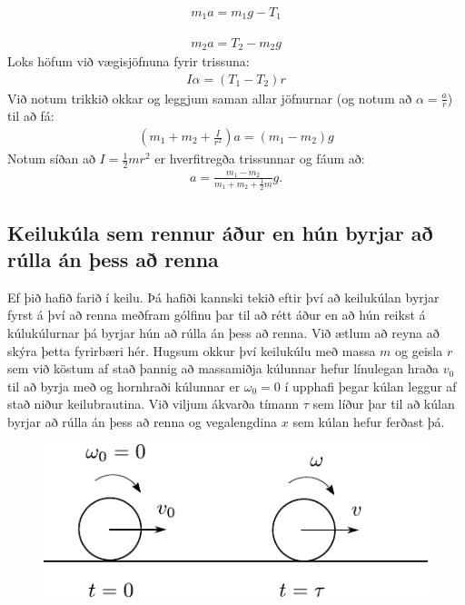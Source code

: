 \ifdefined \wholebook \else\documentclass[oneside]{book}\usepackage{EdlBook}\graphicspath{{figures/}}
\begin{document}
\begin{align*}
    m_1 a = m_1g - T_1
\end{align*}

\begin{align*}
    m_2a = T_2 - m_2g
\end{align*}
Loks höfum við vægisjöfnuna fyrir trissuna:
\begin{align*}
    I\alpha = (T_1 - T_2)r
\end{align*}
Við notum trikkið okkar og leggjum saman allar jöfnurnar (og notum að $\alpha = \frac{a}{r}$) til að fá:
\begin{align*}
    \left(m_1 + m_2 + \frac{I}{r^2}\right)a = \left(m_1 - m_2 \right)g
\end{align*}
Notum síðan að $I = \frac{1}{2}mr^2$ er hverfitregða trissunnar og fáum að:
\begin{align*}
    a = \frac{m_1 - m_2}{m_1 + m_2 + \frac{1}{2}m}g.
\end{align*}



\subsection*{Keilukúla sem rennur áður en hún byrjar að rúlla án þess að renna}

Ef þið hafið farið í keilu. Þá hafiði kannski tekið eftir því að keilukúlan byrjar fyrst á því að renna meðfram gólfinu þar til að rétt áður en að hún reikst á kúlukúlurnar þá byrjar hún að rúlla án þess að renna. Við ætlum að reyna að skýra þetta fyrirbæri hér. Hugsum okkur því keilukúlu með massa $m$ og geisla $r$ sem við köstum af stað þannig að massamiðja kúlunnar hefur línulegan hraða $v_0$ til að byrja með og hornhraði kúlunnar er $\omega_0 = 0$ í upphafi þegar kúlan leggur af stað niður keilubrautina. Við viljum ákvarða tímann $\tau$ sem líður þar til að kúlan byrjar að rúlla án þess að renna og vegalengdina $x$ sem kúlan hefur ferðast þá. 

\begin{figure}[H]
    \centering
    \includegraphics{figures/rullaogrenna.pdf}
\end{figure}
\end{document}
